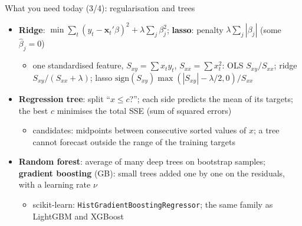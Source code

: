 \begin{frame}{What you need today (3/4): regularisation and trees}
\itemsize{\footnotesize}
\begin{itemize}
    \item \textbf{Ridge}: $\min \sum_t (y_t - \mathbf{x}_t'\beta)^2 + \lambda\sum_j\beta_j^2$; \textbf{lasso}: penalty $\lambda\sum_j|\beta_j|$ (some $\hat\beta_j = 0$)
    \begin{itemize}
        \item one standardised feature, $S_{xy} = \sum x_ty_t$, $S_{xx} = \sum x_t^2$: OLS $S_{xy}/S_{xx}$; ridge $S_{xy}/(S_{xx} + \lambda)$; lasso $\mathrm{sign}(S_{xy})\max(|S_{xy}| - \lambda/2, 0)/S_{xx}$
    \end{itemize}
    \item \textbf{Regression tree}: split ``$x \le c$?''; each side predicts the mean of its targets; the best $c$ minimises the total SSE (sum of squared errors)
    \begin{itemize}
        \item candidates: midpoints between consecutive sorted values of $x$; a tree cannot forecast outside the range of the training targets
    \end{itemize}
    \item \textbf{Random forest}: average of many deep trees on bootstrap samples; \textbf{gradient boosting} (GB): small trees added one by one on the residuals, with a learning rate $\nu$
    \begin{itemize}
        \item scikit-learn: \texttt{HistGradientBoostingRegressor}; the same family as LightGBM and XGBoost
    \end{itemize}
\end{itemize}
\end{frame}

